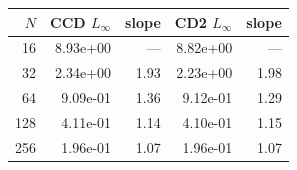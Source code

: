 \begin{tabular}{rrrrr}
\toprule
$N$ & CCD $L_\infty$ & slope & CD2 $L_\infty$ & slope \\
\midrule
16 & 8.93e+00 & --- & 8.82e+00 & --- \\
32 & 2.34e+00 & 1.93 & 2.23e+00 & 1.98 \\
64 & 9.09e-01 & 1.36 & 9.12e-01 & 1.29 \\
128 & 4.11e-01 & 1.14 & 4.10e-01 & 1.15 \\
256 & 1.96e-01 & 1.07 & 1.96e-01 & 1.07 \\
\bottomrule
\end{tabular}
